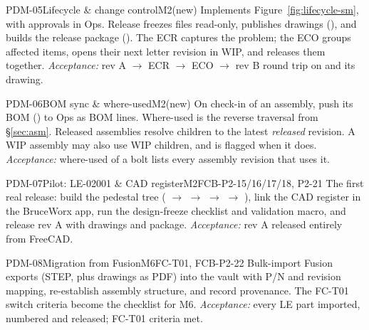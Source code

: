 \begin{epic}{PDM-05}{Lifecycle \& change control}{M2}{\stTodo}{(new)}
Implements Figure~\ref{fig:lifecycle-sm}, with approvals in Ops. Release freezes files read-only, publishes
drawings (), and builds the release package (). The ECR captures the problem;
the ECO groups affected items, opens their next letter revision in WIP, and releases them together.
\emph{Acceptance:} rev A $\rightarrow$ ECR $\rightarrow$ ECO $\rightarrow$ rev B round trip on 
and its drawing.
\end{epic}

\begin{epic}{PDM-06}{BOM sync \& where-used}{M2}{\stTodo}{(new)}
On check-in of an assembly, push its BOM () to Ops as BOM lines. Where-used is the reverse
traversal from \S\ref{sec:asm}. Released assemblies resolve children to the latest \emph{released}
revision. A WIP assembly may also use WIP children, and is flagged when it does.
\emph{Acceptance:} where-used of a bolt lists every assembly revision that uses it.
\end{epic}

\begin{epic}{PDM-07}{Pilot: LE-02001 \& CAD register}{M2}{\stTodo}{FCB-P2-15/16/17/18, P2-21}
The first real release: build the pedestal tree ( $\rightarrow$ 
$\rightarrow$  $\rightarrow$  $\rightarrow$ ), link the CAD
register in the BruceWorx app, run the design-freeze checklist and validation macro, and release rev A with
drawings and package.
\emph{Acceptance:}  rev A released entirely from FreeCAD.
\end{epic}

\begin{epic}{PDM-08}{Migration from Fusion}{M6}{\stTodo}{FC-T01, FCB-P2-22}
Bulk-import Fusion exports (STEP, plus drawings as PDF) into the vault with P/N and revision mapping,
re-establish assembly structure, and record provenance. The FC-T01 switch criteria become the checklist for
M6.
\emph{Acceptance:} every LE part imported, numbered and released; FC-T01 criteria met.
\end{epic}

